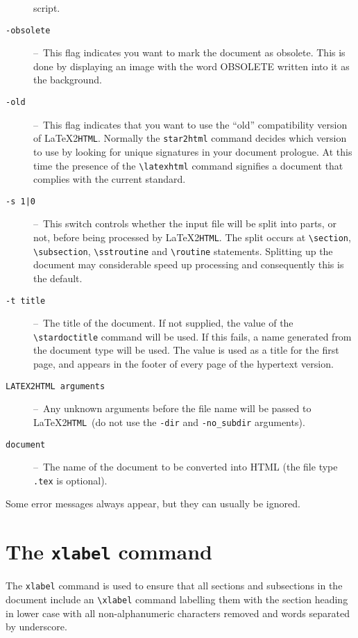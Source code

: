 \documentclass[twoside,11pt]{article}
\newcommand{\stardoctitle}     {Star2HTML\\[1ex]
                                Converting Starlink Documents to Hypertext}
\newcommand{\latexhtml}[2]{#1}
\newcommand{\xlabel}[1]{}
\newcommand{\latextohtml}{\LaTeX2\texttt{HTML}}
\renewcommand{\_}{\texttt{\symbol{95}}}
\newcommand{\dash}{--}
\newcommand{\dash}{-}
\begin{document}
\begin{description}
   script.
\item[\texttt{-obsolete}] \dash\
   This flag indicates you want to mark the document as obsolete. This is
   done by displaying an image with the word OBSOLETE written into it as
   the background.
\item[\texttt{-old}] \dash\
   This flag indicates that you want to use the ``old''
   compatibility version of \latextohtml. Normally the \verb#star2html#
   command decides which version to use by looking for unique
   signatures in your document prologue. At this time the
   presence of the \verb#\latexhtml# command signifies a document that
   complies with the current standard.
\item[\texttt{-s 1|0}] \dash\
   This switch controls whether the input file will be split
   into parts, or not, before being processed by \latextohtml.
   The split occurs at \verb#\section#, \verb#\subsection#,
   \verb#\sstroutine# and \verb#\routine# statements.
   Splitting up the document may considerable speed up processing and
   consequently this is the default.
\item[\texttt{-t title}] \dash\
   The title of the document.
   If not supplied, the value of the \verb#\stardoctitle# command will be used.
   If this fails, a name generated from the document type will be used.
   The value is used as a title for the first page, and appears in the footer of
   every page of the hypertext version.
\item[\texttt{LATEX2HTML arguments}] \dash\
   Any unknown arguments before the file name will be passed to \latextohtml\
   (do not use the \verb#-dir# and \verb#-no_subdir# arguments).
\item[\texttt{document}] \dash\
   The name of the document to be converted into HTML (the file type
   \texttt{.tex} is optional).

\end{description}

Some error messages always appear, but they can usually be ignored.

\newpage
\section{\xlabel{the_xlabel_command}\label{xlabel}The \texttt{xlabel} command}
The \texttt{xlabel} command is used to ensure that all sections and subsections
in the document include an \verb+\xlabel+ command labelling them with the
section heading in lower case with all non-alphanumeric characters removed and
words separated by underscore.
\end{document}
